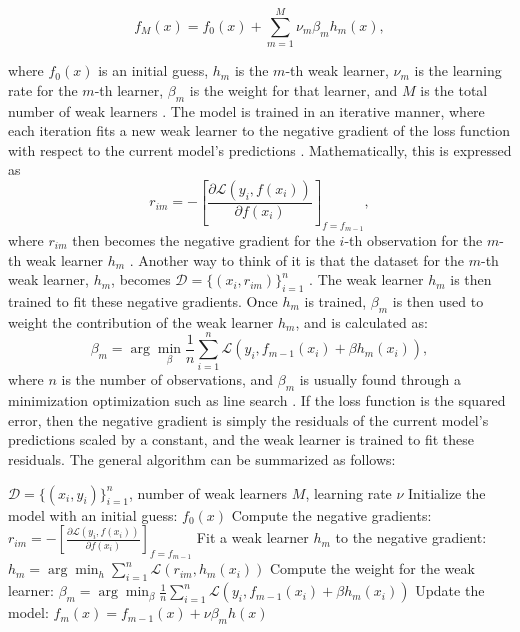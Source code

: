 \[ f_M(x) = f_0(x) + \sum_{m=1}^M \nu_m\beta_m h_m(x), \]

where \(f_0(x)\) is an initial guess, \(h_m\) is the \(m\)-th weak learner, \(\nu_m\) is the learning rate for the \(m\)-th learner, \(\beta_m\) is the weight for that learner, and \(M\) is the total number of weak learners \parencite{friedman2001}. The model is trained in an iterative manner, where each iteration fits a new weak learner to the negative gradient of the loss function with respect to the current model's predictions \parencite{friedman2001}. Mathematically, this is expressed as 
\[r_{im} = -\left[\frac{\partial\mathcal{L}({y_i}, f(x_i))}{\partial f(x_i)}\right]_{f = f_{m-1}},\]
where \(r_{im}\) then becomes the negative gradient for the \(i\)-th observation for the \(m\)-th weak learner \(h_m\) \parencite{friedman2001}. Another way to think of it is that the dataset for the \(m\)-th weak learner, \(h_m\), becomes \(\mathcal{D} = \{(x_i, r_{im})\}_{i=1}^n\) \parencite{smlbook}. The weak learner \(h_m\) is then trained to fit these negative gradients. Once \(h_m\) is trained, \(\beta_m\) is then used to weight the contribution of the weak learner \(h_m\), and is calculated as:
\[\beta_m = \arg\min_{\beta} \frac{1}{n}\sum_{i=1}^n \mathcal{L}(y_i, f_{m-1}(x_i) + \beta h_m(x_i)),\]
where \(n\) is the number of observations, and \(\beta_m\) is usually found through a minimization optimization such as line search \parencite{friedman2001}. If the loss function is the squared error, then the negative gradient is simply the residuals of the current model's predictions scaled by a constant, and the weak learner is trained to fit these residuals. The general algorithm can be summarized as follows:
\begin{algorithm}[ht]
\caption{Gradient Boosting Algorithm}
\begin{algorithmic}[1]
\Require \(\mathcal{D} = \{(x_i, y_i)\}_{i=1}^n\), number of weak learners \(M\), learning rate \(\nu\)
\State Initialize the model with an initial guess: \(f_0(x)\)
    \State Compute the negative gradients: \(r_{im} = -\left[\frac{\partial\mathcal{L}({y_i}, f(x_i))}{\partial f(x_i)}\right]_{f = f_{m-1}}\)
    \State Fit a weak learner \(h_m\) to the negative gradient: \(h_m = \arg\min_{h} \sum_{i=1}^n \mathcal{L}(r_{im},h_m(x_i))\)
    \State Compute the weight for the weak learner: \(\beta_m = \arg\min_{\beta} \frac{1}{n}\sum_{i=1}^n \mathcal{L}(y_i, f_{m-1}(x_i) + \beta h_m(x_i))\)
    \State Update the model: \(f_m(x) = f_{m-1}(x) + \nu \beta_m h(x)\)
\EndFor
\end{algorithmic}
\end{algorithm}

